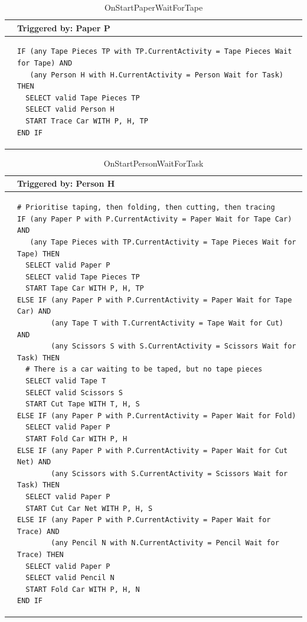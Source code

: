 \documentclass[
  10pt,
  a4paperpaper,
  DIV=11,
  numbers=noendperiod,
  oneside]{scrreprt}
\begin{document}
\begin{longtable}{@{}>{\raggedright\arraybackslash}p{0.25cm}>{\raggedright\arraybackslash}p{13cm}@{}}

\caption{\label{tbl-start_paper_wait_tape}OnStartPaperWaitForTape}

\tabularnewline

  \toprule
   & Triggered by: Paper P\\ \midrule 
  &
\begin{lstlisting}[language=CMPseudo]
IF (any Tape Pieces TP with TP.CurrentActivity = Tape Pieces Wait for Tape) AND
   (any Person H with H.CurrentActivity = Person Wait for Task) THEN
  SELECT valid Tape Pieces TP
  SELECT valid Person H
  START Trace Car WITH P, H, TP
END IF
\end{lstlisting}
  \\ \bottomrule
  

\end{longtable}

\begin{longtable}{@{}>{\raggedright\arraybackslash}p{0.25cm}>{\raggedright\arraybackslash}p{13cm}@{}}

\caption{\label{tbl-start_person_wait_task}OnStartPersonWaitForTask}

\tabularnewline

  \toprule
   & Triggered by: Person H\\ \midrule 
  &
\begin{lstlisting}[language=CMPseudo]
# Prioritise taping, then folding, then cutting, then tracing
IF (any Paper P with P.CurrentActivity = Paper Wait for Tape Car) AND
   (any Tape Pieces with TP.CurrentActivity = Tape Pieces Wait for Tape) THEN
  SELECT valid Paper P
  SELECT valid Tape Pieces TP
  START Tape Car WITH P, H, TP
ELSE IF (any Paper P with P.CurrentActivity = Paper Wait for Tape Car) AND
        (any Tape T with T.CurrentActivity = Tape Wait for Cut) AND
        (any Scissors S with S.CurrentActivity = Scissors Wait for Task) THEN
  # There is a car waiting to be taped, but no tape pieces
  SELECT valid Tape T
  SELECT valid Scissors S
  START Cut Tape WITH T, H, S
ELSE IF (any Paper P with P.CurrentActivity = Paper Wait for Fold)
  SELECT valid Paper P
  START Fold Car WITH P, H
ELSE IF (any Paper P with P.CurrentActivity = Paper Wait for Cut Net) AND
        (any Scissors with S.CurrentActivity = Scissors Wait for Task) THEN
  SELECT valid Paper P
  START Cut Car Net WITH P, H, S
ELSE IF (any Paper P with P.CurrentActivity = Paper Wait for Trace) AND
        (any Pencil N with N.CurrentActivity = Pencil Wait for Trace) THEN
  SELECT valid Paper P
  SELECT valid Pencil N
  START Fold Car WITH P, H, N
END IF
\end{lstlisting}
  \\ \bottomrule
  

\end{longtable}
\end{document}
